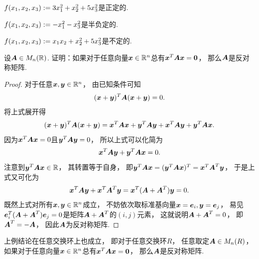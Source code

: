 \begin{example}
\(f(x_1,x_2,x_3) := 3 x_1^2 + x_2^2 + 5 x_3^2\)是正定的.
\end{example}

\begin{example}
\(f(x_1,x_2,x_3) := -x_1^2 - x_3^2\)是半负定的.
\end{example}

\begin{example}
\(f(x_1,x_2,x_3) := x_1 x_2 + x_2^2 + 5 x_3^2\)是不定的.
\end{example}

\begin{example}
设\(\boldsymbol{A} \in M_n(\mathbb{R})\).
证明：如果对于任意向量\(\boldsymbol{x} \in \mathbb{R}^n\)总有\(\boldsymbol{x}^T \boldsymbol{A} \boldsymbol{x} = \boldsymbol0\)，
那么\(\boldsymbol{A}\)是反对称矩阵.
\begin{proof}
对于任意\(\boldsymbol{x}, \boldsymbol{y} \in \mathbb{R}^n\)，
由已知条件可知\begin{equation*}
    (\boldsymbol{x} + \boldsymbol{y})^T \boldsymbol{A} (\boldsymbol{x} + \boldsymbol{y}) = 0.
\end{equation*}
将上式展开得\begin{equation*}
    (\boldsymbol{x} + \boldsymbol{y})^T \boldsymbol{A} (\boldsymbol{x} + \boldsymbol{y})
    = \boldsymbol{x}^T \boldsymbol{A} \boldsymbol{x}
	+ \boldsymbol{y}^T \boldsymbol{A} \boldsymbol{y}
	+ \boldsymbol{x}^T \boldsymbol{A} \boldsymbol{y}
	+ \boldsymbol{y}^T \boldsymbol{A} \boldsymbol{x}.
\end{equation*}
因为\(\boldsymbol{x}^T \boldsymbol{A} \boldsymbol{x} = 0\)且\(\boldsymbol{y}^T \boldsymbol{A} \boldsymbol{y} = 0\)，
所以上式可以化简为\begin{equation*}
    \boldsymbol{x}^T \boldsymbol{A} \boldsymbol{y}
	+ \boldsymbol{y}^T \boldsymbol{A} \boldsymbol{x}
	= 0.
\end{equation*}
注意到\(\boldsymbol{y}^T \boldsymbol{A} \boldsymbol{x} \in \mathbb{R}\)，
其转置等于自身，
即\(\boldsymbol{y}^T \boldsymbol{A} \boldsymbol{x} = (\boldsymbol{y}^T \boldsymbol{A} \boldsymbol{x})^T = \boldsymbol{x}^T \boldsymbol{A}^T \boldsymbol{y}\)，
于是上式又可化为\begin{equation*}
    \boldsymbol{x}^T \boldsymbol{A} \boldsymbol{y}
	+ \boldsymbol{x}^T \boldsymbol{A}^T \boldsymbol{y}
	= \boldsymbol{x}^T (\boldsymbol{A} + \boldsymbol{A}^T) \boldsymbol{y}
	= 0.
\end{equation*}
既然上式对所有\(\boldsymbol{x}, \boldsymbol{y} \in \mathbb{R}^n\)成立，
不妨依次取标准基向量\(
	\boldsymbol{x} = \boldsymbol{e}_i,
	\boldsymbol{y} = \boldsymbol{e}_j
\)，
易见\(\boldsymbol{e}_i^T (\boldsymbol{A} + \boldsymbol{A}^T) \boldsymbol{e}_j = 0\)是矩阵\(\boldsymbol{A} + \boldsymbol{A}^T\)的\((i,j)\)元素，
这就说明\(\boldsymbol{A} + \boldsymbol{A}^T = 0\)，
即\(\boldsymbol{A}^T = -\boldsymbol{A}\)，
因此\(\boldsymbol{A}\)为反对称矩阵.
\end{proof}
\end{example}
\begin{remark}
上例结论在任意交换环上也成立，
即对于任意交换环\(R\)，
任意取定\(\boldsymbol{A} \in M_n(R)\)，
如果对于任意向量\(\boldsymbol{x} \in \mathbb{R}^n\)总有\(\boldsymbol{x}^T \boldsymbol{A} \boldsymbol{x} = \boldsymbol0\)，
那么\(\boldsymbol{A}\)是反对称矩阵.
\end{remark}

